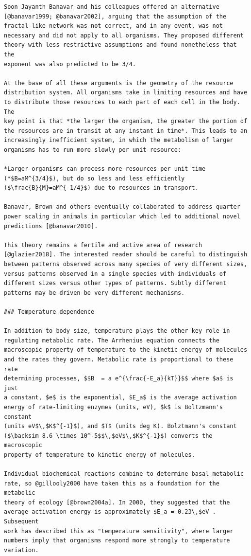 \documentclass[
  10pt,
  letterpaper,
  nols]{tufte-book}
\begin{document}
\begin{verbatim}
Soon Jayanth Banavar and his colleagues offered an alternative
[@banavar1999; @banavar2002], arguing that the assumption of the
fractal-like network was not correct, and in any event, was not
necessary and did not apply to all organisms. They proposed different
theory with less restrictive assumptions and found nonetheless that the
exponent was also predicted to be 3/4.

At the base of all these arguments is the geometry of the resource
distribution system. All organisms take in limiting resources and have
to distribute those resources to each part of each cell in the body. The
key point is that *the larger the organism, the greater the portion of
the resources are in transit at any instant in time*. This leads to an
increasingly inefficient system, in which the metabolism of larger
organisms has to run more slowly per unit resource:

*Larger organisms can process more resources per unit time
(*$B=aM^{3/4}$), but do so less and less efficiently
($\frac{B}{M}=aM^{-1/4}$) due to resources in transport.

Banavar, Brown and others eventually collaborated to address quarter
power scaling in animals in particular which led to additional novel
predictions [@banavar2010].

This theory remains a fertile and active area of research
[@glazier2018]. The interested reader should be careful to distinguish
between patterns observed across many species of very different sizes,
versus patterns observed in a single species with individuals of
different sizes versus other types of patterns. Subtly different
patterns may be driven be very different mechanisms.

### Temperature dependence

In addition to body size, temperature plays the other key role in
regulating metabolic rate. The Arrhenius equation connects the
macroscopic property of temperature to the kinetic energy of molecules
and the rates they govern. Metabolic rate is proportional to these rate
determining processes, $$B  = a e^{\frac{-E_a}{kT}}$$ where $a$ is just
a constant, $e$ is the exponential, $E_a$ is the average activation
energy of rate-limiting enzymes (units, eV), $k$ is Boltzmann's constant
(units eV$\,$K$^{-1}$), and $T$ (units deg K). Bolztmann's constant
($\backsim 8.6 \times 10^-5$$\,$eV$\,$K$^{-1}$) converts the macroscopic
property of temperature to kinetic energy of molecules.

Individual biochemical reactions combine to determine basal metabolic
rate, so @gillooly2000 have taken this as a foundation for the metabolic
theory of ecology [@brown2004a]. In 2000, they suggested that the
average activation energy is approximately $E_a = 0.23\,$eV . Subsequent
work has described this as "temperature sensitivity", where larger
numbers imply that organisms respond more strongly to temperature
variation.


\end{verbatim}
\end{document}
